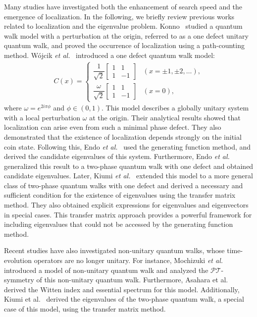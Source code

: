 \documentclass[a4paper,12pt]{article}
\theoremstyle{plain}
\theoremstyle{definition}
\theoremstyle{definition}
\begin{document}
Many studies have investigated both the enhancement of search speed and the emergence of localization.  
In the following, we briefly review previous works related to localization and the eigenvalue problem. Konno~\cite{Konno2010} studied a quantum walk model with a perturbation at the origin, referred to as a one defect unitary quantum walk, and proved the occurrence of localization using a path-counting method. W\'ojcik \textit{et al.}~\cite{Antoni2012} introduced a one defect quantum walk model:
\begin{align}
C(x)=
\begin{cases}
\dfrac{1}{\sqrt{2}}
\begin{bmatrix}
1 & 1\\
1 & -1
\end{bmatrix} & (x = \pm1, \pm2, \ldots), \\[10pt]
\dfrac{\omega}{\sqrt{2}}
\begin{bmatrix}
1 & 1\\
1 & -1
\end{bmatrix} & (x = 0),
\end{cases}
\nonumber
\end{align}
where $\omega = e^{2i\pi\phi}$ and $\phi \in (0,1)$.  
This model describes a globally unitary system with a local perturbation $\omega$ at the origin. Their analytical results showed that localization can arise even from such a minimal phase defect.  
They also demonstrated that the existence of localization depends strongly on the initial coin state.  
Following this, Endo \textit{et al.}~\cite{EndoKonno2014} used the generating function method, and derived the candidate eigenvalues of this system. Furthermore, Endo \textit{et al.}~\cite{KonnoEtAl2013} generalized this result to a two-phase quantum walk with one defect and obtained candidate eigenvalues.  
Later, Kiumi \textit{et al.}~\cite{KiumiSaito2021} extended this model to a more general class of two-phase quantum walks with one defect and derived a necessary and sufficient condition for the existence of eigenvalues using the transfer matrix method.  
They also obtained explicit expressions for eigenvalues and eigenvectors in special cases.  
This transfer matrix approach provides a powerful framework for including eigenvalues that could not be accessed by the generating function method.

Recent studies have also investigated non-unitary quantum walks, whose time-evolution operators are no longer unitary.  
For instance, Mochizuki \textit{et al.}~\cite{Mochizuki2016} introduced a model of non-unitary quantum walk and analyzed the $\mathcal{PT}$-symmetry of this non-unitary quantum walk. Furthermore, Asahara et al.~\cite{AsaharaEtAl2021} derived the Witten index and essential spectrum for this model. Additionally, Kiumi et al.~\cite{KiumiEtAl2022} derived the eigenvalues of the two-phase quantum walk, a special case of this model, using the transfer matrix method.
\end{document}
